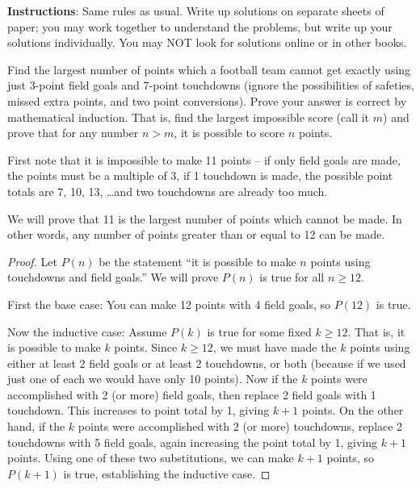 \documentclass[10pt]{exam}
\begin{document}
\noindent \textbf{Instructions}: Same rules as usual.  Write up solutions on separate sheets of paper; you may work together to understand the problems, but write up your solutions individually.  You may NOT look for solutions online or in other books.

\begin{questions}

  \question[8] Find the largest number of points which a football team cannot get exactly using just 3-point field goals and 7-point touchdowns (ignore the possibilities of safeties, missed extra points, and two point conversions).  Prove your answer is correct by mathematical induction.  That is, find the largest impossible score (call it $m$) and prove that for any number $n > m$, it is possible to score $n$ points.

  \begin{solution}
    First note that it is impossible to make 11 points -- if only field goals are made, the points must be a multiple of 3, if 1 touchdown is made, the possible point totals are 7, 10, 13, \ldots and two touchdowns are already too much.

    We will prove that 11 is the largest number of points which cannot be made.  In other words, any number of points greater than or equal to 12 can be made.

    \begin{proof}
      Let $P(n)$ be the statement ``it is possible to make $n$ points using touchdowns and field goals.''  We will prove $P(n)$ is true for all $n \ge 12$.

      First the base case: You can make 12 points with 4 field goals, so $P(12)$ is true.

      Now the inductive case: Assume $P(k)$ is true for some fixed $k \ge 12$.  That is, it is possible to make $k$ points.  Since $k \ge 12$, we must have made the $k$ points using either at least 2 field goals or at least 2 touchdowns, or both (because if we used just one of each we would have only 10 points).  Now if the $k$ points were accomplished with 2 (or more) field goals, then replace 2 field goals with 1 touchdown.  This increases to point total by 1, giving $k + 1$ points.  On the other hand, if the $k$ points were accomplished with $2$ (or more) touchdowns, replace 2 touchdowns with 5 field goals, again increasing the point total by 1, giving $k+1$ points.  Using one of these two substitutions, we can make $k+1$ points, so $P(k+1)$ is true, establishing the inductive case.


\end{proof}
\end{solution}
\end{questions}
\end{document}
